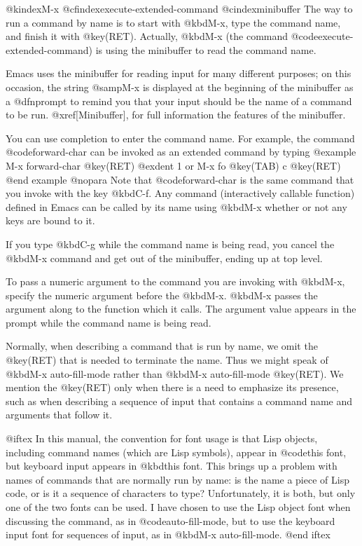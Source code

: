 {{{{@kindex{M-x}
@cfindex{execute-extended-command}
@cindex{minibuffer}
  The way to run a command by name is to start with @kbd{M-x}, type the
command name, and finish it with @key(RET).  Actually, @kbd{M-x} (the
command @code{execute-extended-command}) is using the minibuffer to read
the command name.

  Emacs uses the minibuffer for reading input for many different purposes;
on this occasion, the string @samp{M-x} is displayed at the beginning of
the minibuffer as a @dfn{prompt} to remind you that your input should be
the name of a command to be run.  @xref[Minibuffer], for full information
the features of the minibuffer.

  You can use completion to enter the command name.  For example, the
command @code{forward-char} can be invoked as an extended command by typing
@example
M-x forward-char @key(RET)
@exdent 1 or
M-x fo @key(TAB) c @key(RET)
@end example
@nopara
Note that @code{forward-char} is the same command that you invoke with
the key @kbd{C-f}.  Any command (interactively callable function) defined
in Emacs can be called by its name using @kbd{M-x} whether or not any
keys are bound to it.

  If you type @kbd{C-g} while the command name is being read, you cancel
the @kbd{M-x} command and get out of the minibuffer, ending up at top level.

  To pass a numeric argument to the command you are invoking with
@kbd{M-x}, specify the numeric argument before the @kbd{M-x}.  @kbd{M-x}
passes the argument along to the function which it calls.  The argument
value appears in the prompt while the command name is being read.

  Normally, when describing a command that is run by name, we omit the
@key(RET) that is needed to terminate the name.  Thus we might speak of
@kbd{M-x auto-fill-mode} rather than @kbd{M-x auto-fill-mode @key(RET)}.
We mention the @key(RET) only when there is a need to emphasize its
presence, such as when describing a sequence of input that contains a
command name and arguments that follow it.

@iftex
  In this manual, the convention for font usage is that Lisp objects,
including command names (which are Lisp symbols), appear in @code{this
font}, but keyboard input appears in @kbd{this font}.  This brings up
a problem with names of commands that are normally run by name: is the
name a piece of Lisp code, or is it a sequence of characters to type?
Unfortunately, it is both, but only one of the two fonts can be used.
I have chosen to use the Lisp object font when discussing the command,
as in @code{auto-fill-mode}, but to use the keyboard input font for
sequences of input, as in @kbd{M-x auto-fill-mode}.
@end iftex

}}}}
